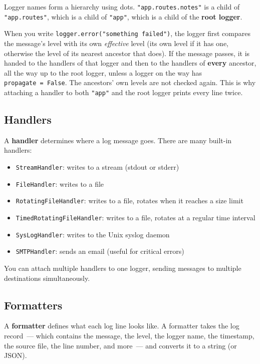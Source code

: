 \noindent{}Logger names form a hierarchy using dots. \texttt{"app.routes.notes"} is a child of \texttt{"app.routes"}, which is a child of \texttt{"app"}, which is a child of the \textbf{root logger}.

When you write \texttt{logger.}\allowbreak{}\texttt{error("something\ failed")}, the logger first compares the message's level with its own \emph{effective} level (its own level if it has one, otherwise the level of its nearest ancestor that does). If the message passes, it is handed to the handlers of that logger and then to the handlers of \textbf{every} ancestor, all the way up to the root logger, unless a logger on the way has \texttt{propagate\ =\ False}. The ancestors' own levels are not checked again. This is why attaching a handler to both \texttt{"app"} and the root logger prints every line twice.

\subsection*{Handlers}\label{16-logging-error-handling:handlers}

A \textbf{handler} determines where a log message goes. There are many built-in handlers:

\begin{itemize}
\tightlist
\item
  \texttt{StreamHandler}: writes to a stream (stdout or stderr)
\item
  \texttt{FileHandler}: writes to a file
\item
  \texttt{RotatingFileHandler}: writes to a file, rotates when it reaches a size limit
\item
  \texttt{TimedRotatingFileHandler}: writes to a file, rotates at a regular time interval
\item
  \texttt{SysLogHandler}: writes to the Unix syslog daemon
\item
  \texttt{SMTPHandler}: sends an email (useful for critical errors)
\end{itemize}

\noindent{}You can attach multiple handlers to one logger, sending messages to multiple destinations simultaneously.

\subsection*{Formatters}\label{16-logging-error-handling:formatters}

A \textbf{formatter} defines what each log line looks like. A formatter takes the log record~--- which contains the message, the level, the logger name, the timestamp, the source file, the line number, and more~--- and converts it to a string (or JSON).

